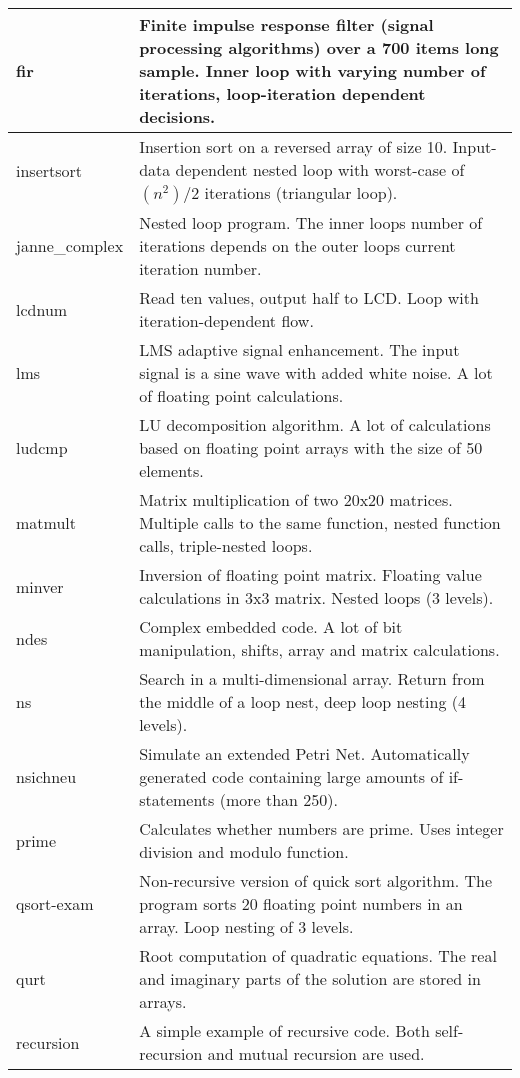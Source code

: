 \documentclass[12pt,twoside,notitlepage]{report}
\begin{document}
\begin{longtable} { p{3cm} p{10cm}}
\midrule
fir & Finite impulse response filter (signal processing algorithms) over a 700 items long sample. Inner loop with varying number of iterations, loop-iteration dependent decisions.\\
\midrule
insertsort & Insertion sort on a reversed array of size 10. Input-data dependent nested loop with worst-case of $(n^2)/2$ iterations (triangular loop). \\
\midrule
 janne\_complex & Nested loop program. 	The inner loops number of iterations depends on the outer loops current iteration number.\\
\midrule
 lcdnum & Read ten values, output half to LCD. 	Loop with iteration-dependent flow.\\
\midrule
 lms & LMS adaptive signal enhancement. The input signal is a sine wave with added white noise. A lot of floating point calculations.\\
\midrule
ludcmp & LU decomposition algorithm. A lot of calculations based on floating point arrays with the size of 50 elements.\\
\midrule
matmult & Matrix multiplication of two 20x20 matrices. Multiple calls to the same function, nested function calls, triple-nested loops.\\
\midrule
minver & Inversion of floating point matrix. Floating value calculations in 3x3 matrix. Nested loops (3 levels). \\
\midrule
ndes & Complex embedded code. A lot of bit manipulation, shifts, array and matrix calculations.\\
\midrule
ns & Search in a multi-dimensional array. Return from the middle of a loop nest, deep loop nesting (4 levels).\\
\midrule
nsichneu & Simulate an extended Petri Net. Automatically generated code containing large amounts of if-statements (more than 250).\\
\midrule
prime & Calculates whether numbers are prime. Uses integer division and modulo function.\\
\midrule
qsort-exam & Non-recursive version of quick sort algorithm. The program sorts 20 floating point numbers in an array. Loop nesting of 3 levels.\\
\midrule
qurt & Root computation of quadratic equations. The real and imaginary parts of the solution are stored in arrays.\\
\midrule
recursion & A simple example of recursive code. Both self-recursion and mutual recursion are used.\\

\end{longtable}
\end{document}
